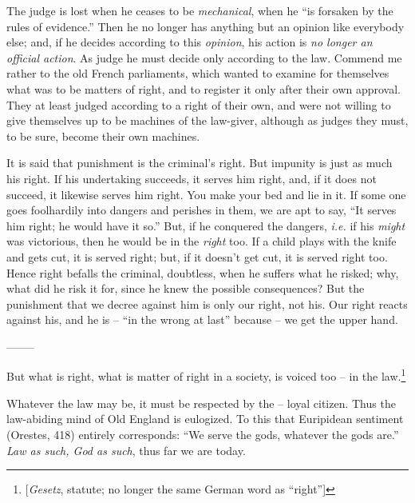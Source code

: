 The judge is lost when he ceases to be \textit{mechanical}, when he ``is 
forsaken by the rules of evidence.'' Then he no longer has anything but an 
opinion like everybody else; and, if he decides according to this 
\textit{opinion}, his action is \textit{no longer an official action}. As 
judge he must decide only according to the law. Commend me rather to the old 
French parliaments, which wanted to examine for themselves what was to be 
matters of right, and to register it only after their own approval. They at 
least judged according to a right of their own, and were not willing to give 
themselves up to be machines of the law-giver, although as judges they must, 
to be sure, become their own machines.

It is said that punishment is the criminal's right. But impunity is just as 
much his right. If his undertaking succeeds, it serves him right, and, if it 
does not succeed, it likewise serves him right. You make your bed and lie in 
it. If some one goes foolhardily into dangers and perishes in them, we are apt 
to say, ``It serves him right; he would have it so.'' But, if he conquered 
the dangers, \textit{i.e.} if his \textit{might} was victorious, then he would 
be in the \textit{right} too. If a child plays with the knife and gets cut, it 
is served right; but, if it doesn't get cut, it is served right too. Hence 
right befalls the criminal, doubtless, when he suffers what he risked; why, 
what did he risk it for, since he knew the possible consequences? But the 
punishment that we decree against him is only our right, not his. Our right 
reacts against his, and he is -- ``in the wrong at last'' because -- we get 
the upper hand.

\begin{center}
--------\end{center}


But what is right, what is matter of right in a society, is voiced too -- in 
the law.\footnote{[\textit{Gesetz}, statute; no longer the same German word as 
``right'']}

Whatever the law may be, it must be respected by the -- loyal citizen. Thus 
the law-abiding mind of Old England is eulogized. To this that Euripidean 
sentiment (Orestes, 418) entirely corresponds: ``We serve the gods, whatever 
the gods are.'' \textit{Law as such, God as such}, thus far we are today.

